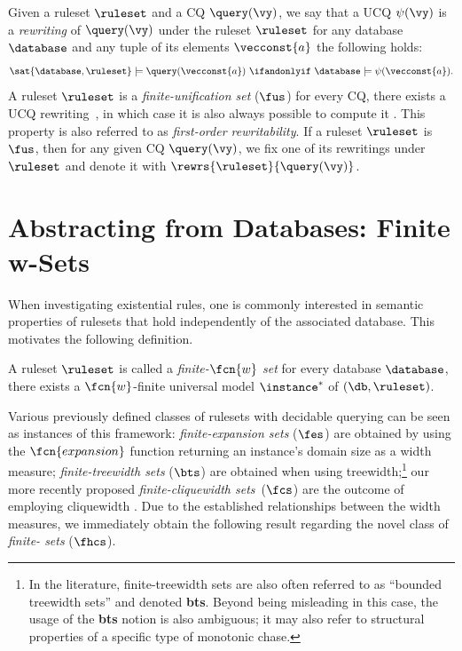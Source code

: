 \medskip {}
Given a ruleset $\ruleset$ and a CQ $\query(\vy)$, we say that a UCQ $\psi(\vy)$ is a {\em rewriting} of $\query(\vy)$ under the ruleset $\ruleset$ \ifandonlyif for any database $\database$ and any tuple of its elements $\vecconst{a}$ the following holds:
%
$$\sat{\database,\ruleset} \models \query(\mbox{$\vecconst{a}$}) \ \ifandonlyif \ \database \models \psi(\vecconst{a}).$$%
%
A ruleset $\ruleset$ is a {\em finite-unification set} ($\fus$) \iffi for every CQ, there exists a UCQ rewriting~\cite{BagLecMugSal11}, in which case it is also always possible to compute it \cite{fusalgo}. This property is also referred to as \emph{first-order rewritability}.
%
If a ruleset $\ruleset$ is $\fus$, then for any given CQ $\query(\vy)$, we fix one of its rewritings under $\ruleset$ and denote it with $\rewrs{\ruleset}{\query(\vy)}$.

%



\section{Abstracting from Databases: Finite w-Sets}\label{sec:finitewsets}

When investigating existential rules, one is commonly interested in semantic properties of rulesets that hold independently of the associated database. This motivates the following definition.

\begin{definition}\label{def:finitewset}
	A ruleset $\ruleset$ is called a \emph{finite-$\fcn{w}$ set} \iffi for every database $\database$, there exists a $\fcn{w}$-finite universal model $\instance^*$ of $(\db,\ruleset)$.
\end{definition}

Various previously defined classes of rulesets with decidable querying can be seen as instances of this framework: \emph{finite-expansion sets} ($\fes$) are obtained by using the $\fcn{expansion}$ function returning an instance's domain size as a width measure; \emph{finite-treewidth sets} ($\bts$) are obtained when using treewidth;\footnote{In the literature, finite-treewidth sets are also often referred to as ``bounded treewidth sets'' and denoted \textbf{bts}. Beyond being misleading in this case, the usage of the \textbf{bts} notion is also ambiguous; it may also refer to structural properties of a specific type of monotonic chase.} our more recently proposed \emph{finite-cliquewidth sets}~($\fcs$) are the outcome of employing cliquewidth \cite{ICDT2023}. Due to the established relationships between the width measures, we immediately obtain the following result regarding the novel class of \emph{finite-\ercwidth{} sets} ($\fhcs$).

